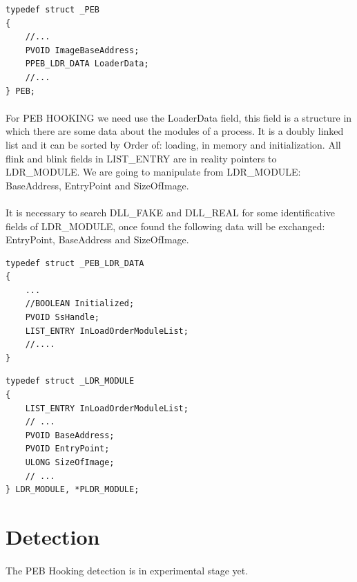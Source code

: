 \documentclass[12pt,a4paper,english]{book}
\newcommand{\keyword}[1]{\index{#1}#1}
\newcommand{\paraph}{\paragraph{}}
\begin{document}
\lstset{language=C,caption=Process Environment Block}
\begin{lstlisting}
typedef struct _PEB
{
    //...
    PVOID ImageBaseAddress;
    PPEB_LDR_DATA LoaderData;
    //...
} PEB;
\end{lstlisting}

\paraph{}
For PEB HOOKING we need use the LoaderData field, this field is a structure in which there are some data about the modules of a process. It is a doubly linked list and it can be sorted by Order of: loading, in memory and initialization. All flink and blink fields in LIST\_ENTRY are in reality pointers to LDR\_MODULE. We are going to manipulate from LDR\_MODULE: BaseAddress, EntryPoint and SizeOfImage.

\paraph{}
It is necessary to search DLL\_FAKE and DLL\_REAL for some identificative fields of LDR\_MODULE, once found the following data will be exchanged: EntryPoint, BaseAddress and SizeOfImage.

\lstset{language=C,caption=PEB Loader Data}
\begin{lstlisting}
typedef struct _PEB_LDR_DATA
{
    ...
    //BOOLEAN Initialized;
    PVOID SsHandle;
    LIST_ENTRY InLoadOrderModuleList;
    //....
}
\end{lstlisting}

\lstset{language=C,caption=Loader Module Data}
\begin{lstlisting}
typedef struct _LDR_MODULE
{
    LIST_ENTRY InLoadOrderModuleList;
    // ...
    PVOID BaseAddress;
    PVOID EntryPoint;
    ULONG SizeOfImage;
    // ...
} LDR_MODULE, *PLDR_MODULE;
\end{lstlisting}

\section{Detection}
\paraph{}
The PEB Hooking detection is in experimental stage yet.



\fancyhead[LE,RO]{}
\printbibliography[heading=bibintoc]

\clearpage
{}
\printindex
\end{document}
